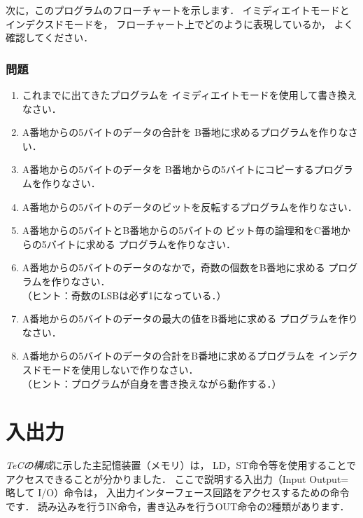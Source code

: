 次に，このプログラムのフローチャートを示します．
イミディエイトモードとインデクスドモードを，
フローチャート上でどのように表現しているか，
よく確認してください．

\begin{center}
\end{center}

\subsubsection{問題}
\begin{enumerate}
\item これまでに出てきたプログラムを
  イミディエイトモードを使用して書き換えなさい．
\item A番地からの5バイトのデータの合計を
  B番地に求めるプログラムを作りなさい．
\item A番地からの5バイトのデータを
  B番地からの5バイトにコピーするプログラムを作りなさい．
\item A番地からの5バイトのデータのビットを反転するプログラムを作りなさい．
\item A番地からの5バイトとB番地からの5バイトの
  ビット毎の論理和をC番地からの5バイトに求める
  プログラムを作りなさい．
\item A番地からの5バイトのデータのなかで，奇数の個数をB番地に求める
  プログラムを作りなさい．\\
  （ヒント：奇数のLSBは必ず1になっている．）
\item A番地からの5バイトのデータの最大の値をB番地に求める
  プログラムを作りなさい．
\item A番地からの5バイトのデータの合計をB番地に求めるプログラムを
  インデクスドモードを使用しないで作りなさい．\\
  （ヒント：プログラムが自身を書き換えながら動作する．）
\end{enumerate}

\newpage
\section{入出力}
\emph{ TeCの構成}に示した主記憶装置（メモリ）は，
LD，ST命令等を使用することでアクセスできることが分かりました．
ここで説明する入出力（Input Output=略して I/O）命令は，
入出力インターフェース回路をアクセスするための命令です．
読み込みを行うIN命令，書き込みを行うOUT命令の2種類があります．


